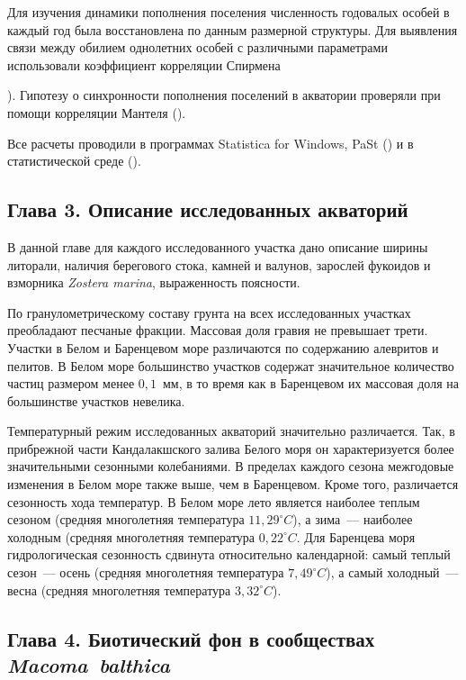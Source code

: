 Для изучения динамики пополнения поселения численность годовалых особей в каждый год была восстановлена по данным размерной структуры.
Для выявления связи между обилием однолетних особей с различными параметрами использовали коэффициент корреляции Спирмена {\cite{Hollander_et_al_2013}).
Гипотезу о синхронности пополнения поселений в акватории проверяли при помощи корреляции Мантеля (\cite{Legendre_Legendre_2012}).

Все расчеты проводили в программах Statistica for Windows,  PaSt (\cite{Hammer_et_al_2001}) и в статистической среде \R{} (\cite{R_2014}).

\subsection*{Глава 3. Описание исследованных акваторий}
В данной главе для каждого исследованного участка дано описание ширины литорали, наличия берегового стока, камней и валунов, зарослей фукоидов и взморника \textit{Zostera marina}, выраженность поясности.

По гранулометрическому составу грунта на всех исследованных участках преобладают песчаные фракции.
Массовая доля гравия не превышает трети.
Участки в Белом и Баренцевом море различаются по содержанию алевритов и пелитов. 
В Белом море большинство участков содержат значительное количество частиц размером менее $0,1$~мм, в то время как в Баренцевом их массовая доля на большинстве участков невелика.

Температурный режим исследованных акваторий значительно различается.
Так, в прибрежной части Кандалакшского залива Белого моря он характеризуется более значительными сезонными колебаниями.
В пределах каждого сезона межгодовые изменения в Белом море также выше, чем в Баренцевом.
Кроме того, различается сезонность хода температур. 
В Белом море лето является наиболее теплым сезоном (средняя многолетняя температура $11,29^{\circ}C$), а зима~--- наиболее холодным (средняя многолетняя температура $0,22^{\circ}C$.
Для Баренцева моря гидрологическая сезонность сдвинута относительно календарной: самый теплый сезон~--- осень (средняя многолетняя температура $7,49^{\circ}C$), а самый холодный~--- весна (средняя многолетняя температура $3,32^{\circ}C$).



\subsection*{Глава 4. Биотический фон в сообществах \textit{Macoma~balthica}}

}
